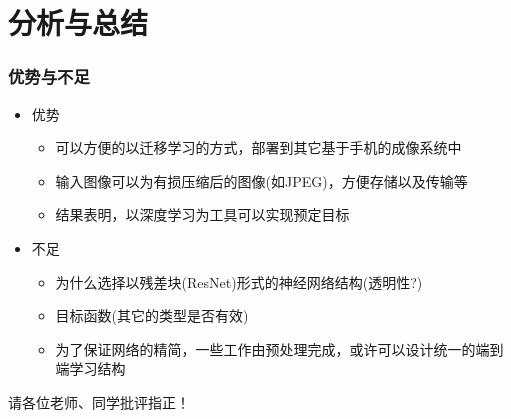 \documentclass{beamer}
\begin{document}
\section{分析与总结}

\begin{frame}
\frametitle{优势与不足}
\begin{itemize}
\item 优势
\begin{itemize}
\item 可以方便的以迁移学习的方式，部署到其它基于手机的成像系统中
\item 输入图像可以为有损压缩后的图像(如JPEG)，方便存储以及传输等
\item 结果表明，以深度学习为工具可以实现预定目标
\end{itemize}
\item 不足
\begin{itemize}
\item 为什么选择以残差块(ResNet)形式的神经网络结构(透明性?)
\item 目标函数(其它的类型是否有效)
\item 为了保证网络的精简，一些工作由预处理完成，或许可以设计统一的端到端学习结构
\end{itemize}
\end{itemize}

\end{frame}

\begin{frame}[plain]

{
\Large
\bfseries
\begin{center}
\color{orange}请各位\color{green}老师、同学\color{blue}批评指正！
\end{center}
}

\end{frame}
\end{document}

